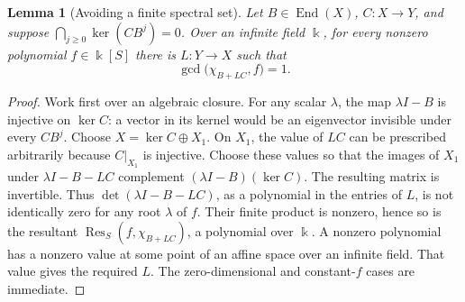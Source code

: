 \documentclass[11pt]{amsart}
\newtheorem{lemma}[theorem]{Lemma}
\theoremstyle{definition}
\newcommand{\kk}{\Bbbk}
\newcommand{\End}{\operatorname{End}}
\begin{document}
\begin{lemma}[Avoiding a finite spectral set]\label{lem:avoidance}
Let \(B\in\End(X)\), \(C:X\to Y\), and suppose
\(\bigcap_{j\ge0}\ker(CB^j)=0\). Over an infinite field \(\kk\), for every nonzero
polynomial \(f\in\kk[S]\) there is \(L:Y\to X\) such that
\[
\gcd\bigl(\chi_{B+LC},f\bigr)=1.
\]
\end{lemma}
\begin{proof}
Work first over an algebraic closure. For any scalar \(\lambda\), the map
\(\lambda I-B\) is injective on \(\ker C\): a vector in its kernel would be
an eigenvector invisible under every \(CB^j\).
Choose \(X=\ker C\oplus X_1\). On \(X_1\), the value of \(LC\) can be prescribed
arbitrarily because \(C|_{X_1}\) is injective.
Choose these values so that the images of \(X_1\) under
\(\lambda I-B-LC\) complement \((\lambda I-B)(\ker C)\).
The resulting matrix is invertible.
Thus \(\det(\lambda I-B-LC)\), as a polynomial in the entries of \(L\),
is not identically zero for any root \(\lambda\) of \(f\).
Their finite product is nonzero, hence so is the resultant
\(\operatorname{Res}_S(f,\chi_{B+LC})\), a polynomial over \(\kk\).
A nonzero polynomial has a nonzero value at some point of an affine space over
an infinite field. That value gives the required \(L\).
The zero-dimensional and constant-\(f\) cases are immediate.
\end{proof}
\end{document}
